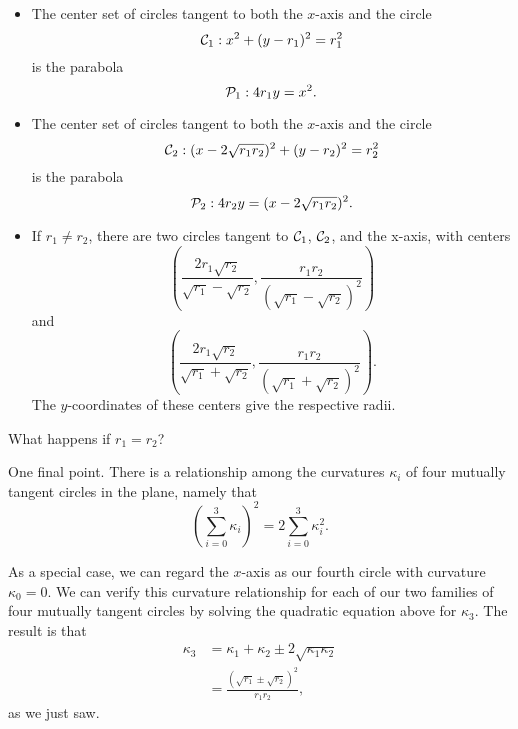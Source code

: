 \documentclass{ximera}
\newcommand{\pskip}{\vskip 0.1 in}
\begin{document}
\begin{itemize}
\item{The center set of circles tangent to both the $x$-axis and the circle
\[
     {\cal C}_1: x^2 + (y-r_1)^2 = r_1^2
\] 
is the parabola
\[
    {\cal P}_1: 4r_1 y = x^2 .
\]
}

\item{The center set of circles tangent to both the $x$-axis and the circle
\[
     {\cal C}_2: (x-2\sqrt{r_1r_2})^2 + (y-r_2)^2 = r_2^2
\] 
is the parabola
\[
    {\cal P}_2: 4r_2 y = (x-2\sqrt{r_1r_2})^2 .
\]
}

\item{If $r_1\neq r_2$, there are two circles tangent to ${\cal C}_1$, ${\cal C}_2$, and the x-axis, with centers
\[
      \left( \frac{2r_1\sqrt{r_2}}{\sqrt{r_1} -\sqrt{r_2}} , \frac{r_1 r_2}{(\sqrt{r_1} -\sqrt{r_2})^2}  \right) 
\]
and
\[
      \left( \frac{2r_1\sqrt{r_2}}{\sqrt{r_1} +\sqrt{r_2}} , \frac{r_1 r_2}{(\sqrt{r_1} +\sqrt{r_2})^2}  \right) .
\]
The $y$-coordinates of these centers give the respective radii.
}
\end{itemize}


\begin{question} \label{Q43ttgt:Spheres}
What happens if $r_1=r_2$?
\end{question}

One final point. There is a relationship among the curvatures $\kappa_i$ of four mutually tangent circles in the plane, namely that
\[
    \left( \sum_{i=0}^3 \kappa_i \right)^2 = 2 \sum_{i=0}^3 \kappa_i^2 .     \label{Eq:Q1TangentSpheres}
\]






As a special case, we can regard the $x$-axis as our fourth circle with curvature $\kappa_0 = 0$. We can verify this curvature relationship for each of our two families of four mutually tangent circles by solving the quadratic equation above for $\kappa_3$. The result is that
\begin{align*}
   \kappa_3   &= \kappa_1 + \kappa_2 \pm 2\sqrt{\kappa_1\kappa_2}  \\
                   &= \frac{(\sqrt{r_1} \pm\sqrt{r_2})^2}{r_1 r_2} ,
\end{align*}
as we just saw.
\end{document}

